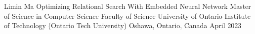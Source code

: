 

\usepackage{hyperref}
\hypersetup{
	colorlinks,
	citecolor=black,
	filecolor=black,
	linkcolor=black,
	urlcolor=black
}

%





\thesisTitle
	{Limin Ma}
	{Optimizing Relational Search With Embedded Neural Network}
	{Master of Science in Computer Science}
	{Faculty of Science}
	{University of Ontario Institute of Technology (Ontario Tech University)}
	{Oshawa, Ontario, Canada}
	{April}
	{2023}







\onehalfspacing
\tableofcontents
\listoftables
\listoffigures


\printnomenclature 

\clearpage
\doublespacing
{}

\mainmatter


\backmatter
\printbibliography[heading=bibintoc]


